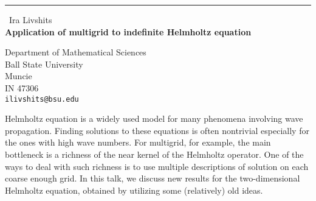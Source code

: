 \documentclass{report}
\begin{document}
\begin{center}
\rule{6in}{1pt} \
{\large Ira Livshits \\
{\bf Application of multigrid to indefinite Helmholtz equation}}

Department of Mathematical Sciences \\ Ball State University \\ Muncie \\ IN 47306
\\
{\tt ilivshits@bsu.edu}\end{center}

Helmholtz equation is a widely used model for many phenomena involving
wave propagation. Finding solutions to these equations is often
nontrivial especially for the ones with high wave numbers. For multigrid,
for example, the main bottleneck is a richness of the near kernel of the
Helmholtz operator. One of the ways to deal with such richness is to
use multiple descriptions of solution on each coarse enough grid. In this
talk, we discuss new results for the two-dimensional Helmholtz equation,
obtained by utilizing some (relatively) old ideas.
\end{document}
